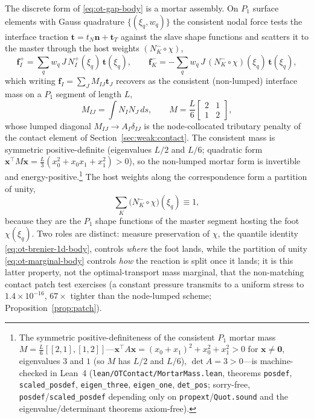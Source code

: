 \documentclass{svjour3}                 %
\newcommand{\nbf}{\bm{n}}
\newcommand{\tbf}{\bm{t}}
\newcommand{\fbf}{\bm{f}}
\newcommand{\code}[1]{\texttt{#1}}
\begin{document}
The discrete form of \eqref{eq:ot-gap-body} is a mortar assembly. On $P_1$ surface elements with Gauss
quadrature $\{(\xi_q,w_q)\}$ the consistent nodal force tests the interface traction $\tbf=t_N\nbf+\tbf_T$
against the slave shape functions and scatters it to the master through the host weights $(N_K^-\!\circ\chi)$,
\begin{equation}\label{eq:ot-force-body}
\fbf_I^+=\sum_q w_q\,J\,N_I^+(\xi_q)\,\tbf(\xi_q),\qquad
\fbf_K^-=-\sum_q w_q\,J\,(N_K^-\!\circ\chi)(\xi_q)\,\tbf(\xi_q),
\end{equation}
which writing $\fbf_I=\sum_J M_{IJ}\tbf_J$ recovers as the consistent (non-lumped) interface mass on a $P_1$
segment of length $L$,
\begin{equation}\label{eq:ot-mortar-mass-body}
M_{IJ}=\int N_I N_J\,ds,\qquad M=\frac{L}{6}\begin{bmatrix}2&1\\[1pt]1&2\end{bmatrix},
\end{equation}
whose lumped diagonal $M_{IJ}\to A_I\delta_{IJ}$ is the node-collocated tributary penalty of the contact element
of Section~\ref{sec:weak:contact}. The consistent mass is symmetric positive-definite (eigenvalues $L/2$ and
$L/6$; quadratic form $\bm x^{\top}M\bm x=\tfrac{L}{3}(x_0^2+x_0x_1+x_1^2)>0$), so the non-lumped mortar form is
invertible and energy-positive.\footnote{The symmetric positive-definiteness of the consistent $P_1$ mortar mass
$M=\tfrac{L}{6}[[2,1],[1,2]]$---$\bm x^{\top}A\bm x=(x_0{+}x_1)^2+x_0^2+x_1^2>0$ for $\bm x\neq\bm0$, eigenvalues
$3$ and $1$ (so $M$ has $L/2$ and $L/6$), $\det A=3>0$---is machine-checked in Lean~4
(\code{lean/OTContact/MortarMass.lean}, theorems \code{posdef}, \code{scaled\_posdef}, \code{eigen\_three},
\code{eigen\_one}, \code{det\_pos}; sorry-free, \code{posdef}/\code{scaled\_posdef} depending only on
\code{propext}/\code{Quot.sound} and the eigenvalue/determinant theorems axiom-free).} The host weights along the
correspondence form a partition of unity,
\begin{equation}\label{eq:ot-marginal-body}
\sum_K\big(N_K^-\!\circ\chi\big)(\xi_q)\equiv1 ,
\end{equation}
because they are the $P_1$ shape functions of the master segment hosting the foot $\chi(\xi_q)$. Two roles are
distinct: measure preservation of $\chi$, the quantile identity \eqref{eq:ot-brenier-1d-body}, controls
\emph{where} the foot lands, while the partition of unity \eqref{eq:ot-marginal-body} controls \emph{how} the
reaction is split once it lands; it is this latter property, not the optimal-transport mass marginal, that the
non-matching contact patch test exercises (a constant pressure transmits to a uniform stress to
$1.4\times10^{-16}$, $67\times$ tighter than the node-lumped scheme; Proposition~\ref{prop:patch}).
\end{document}
